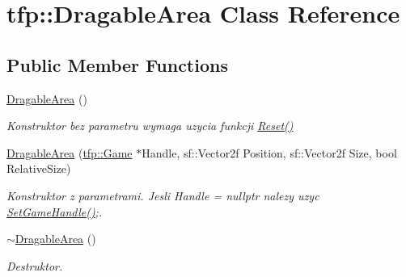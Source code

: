 \hypertarget{classtfp_1_1_dragable_area}{}\section{tfp\+:\+:Dragable\+Area Class Reference}
\label{classtfp_1_1_dragable_area}
\subsection*{Public Member Functions}
\begin{DoxyCompactItemize}
\item 
\mbox{\label{classtfp_1_1_dragable_area_a45f053c1097a1b98d077b155e19840e0}} 
\mbox{\hyperlink{classtfp_1_1_dragable_area_a45f053c1097a1b98d077b155e19840e0}{Dragable\+Area}} ()
\begin{DoxyCompactList}\small\item\em Konstruktor bez parametru wymaga uzycia funkcji \mbox{\hyperlink{classtfp_1_1_dragable_area_a3142a5b247faf918af0b2bbc557707db}{Reset()}} \end{DoxyCompactList}\item 
\mbox{\label{classtfp_1_1_dragable_area_a093621d902ca03b14c499d7d3b9a45ac}} 
\mbox{\hyperlink{classtfp_1_1_dragable_area_a093621d902ca03b14c499d7d3b9a45ac}{Dragable\+Area}} (\mbox{\hyperlink{classtfp_1_1_game}{tfp\+::\+Game}} $\ast$Handle, sf\+::\+Vector2f Position, sf\+::\+Vector2f Size, bool Relative\+Size)
\begin{DoxyCompactList}\small\item\em Konstruktor z parametrami. Jesli Handle = nullptr nalezy uzyc \mbox{\hyperlink{classtfp_1_1_dragable_area_a8b699f79826c5225ffe3e58e2ebda12a}{Set\+Game\+Handle()}};. \end{DoxyCompactList}\item 
\mbox{\label{classtfp_1_1_dragable_area_ade01cf321c7f81ce585addb89ed06919}} 
\mbox{\hyperlink{classtfp_1_1_dragable_area_ade01cf321c7f81ce585addb89ed06919}{$\sim$\+Dragable\+Area}} ()
\begin{DoxyCompactList}\small\item\em Destruktor. \end{DoxyCompactList}\item 
\mbox{\label{classtfp_1_1_dragable_area_a3142a5b247faf918af0b2bbc557707db}} 

\end{DoxyCompactItemize}
